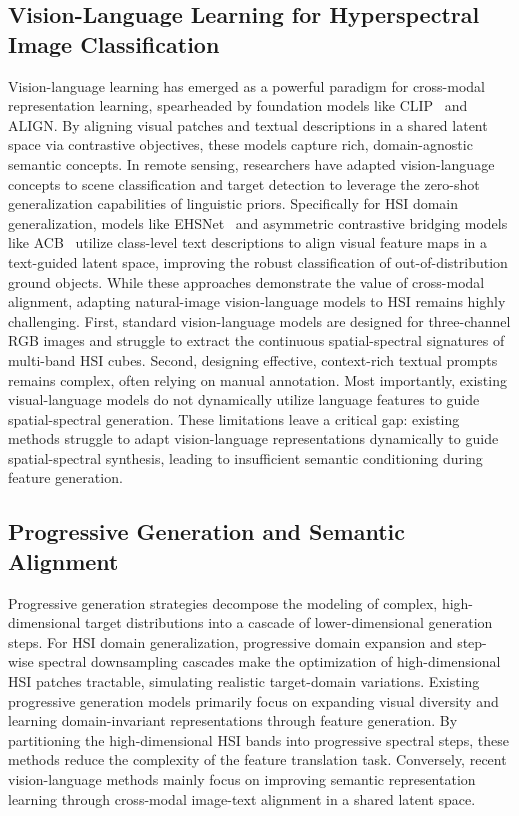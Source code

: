 \subsection{Vision-Language Learning for Hyperspectral Image Classification}
Vision-language learning has emerged as a powerful paradigm for cross-modal representation learning, spearheaded by foundation models like CLIP~\cite{radford2021learning} and ALIGN. By aligning visual patches and textual descriptions in a shared latent space via contrastive objectives, these models capture rich, domain-agnostic semantic concepts. In remote sensing, researchers have adapted vision-language concepts to scene classification and target detection to leverage the zero-shot generalization capabilities of linguistic priors. Specifically for HSI domain generalization, models like EHSNet~\cite{ehsnet2023} and asymmetric contrastive bridging models like ACB~\cite{acb2023} utilize class-level text descriptions to align visual feature maps in a text-guided latent space, improving the robust classification of out-of-distribution ground objects. While these approaches demonstrate the value of cross-modal alignment, adapting natural-image vision-language models to HSI remains highly challenging. First, standard vision-language models are designed for three-channel RGB images and struggle to extract the continuous spatial-spectral signatures of multi-band HSI cubes. Second, designing effective, context-rich textual prompts remains complex, often relying on manual annotation. Most importantly, existing visual-language models do not dynamically utilize language features to guide spatial-spectral generation. These limitations leave a critical gap: existing methods struggle to adapt vision-language representations dynamically to guide spatial-spectral synthesis, leading to insufficient semantic conditioning during feature generation.

\subsection{Progressive Generation and Semantic Alignment}
Progressive generation strategies decompose the modeling of complex, high-dimensional target distributions into a cascade of lower-dimensional generation steps. For HSI domain generalization, progressive domain expansion and step-wise spectral downsampling cascades make the optimization of high-dimensional HSI patches tractable, simulating realistic target-domain variations. Existing progressive generation models primarily focus on expanding visual diversity and learning domain-invariant representations through feature generation. By partitioning the high-dimensional HSI bands into progressive spectral steps, these methods reduce the complexity of the feature translation task. Conversely, recent vision-language methods mainly focus on improving semantic representation learning through cross-modal image-text alignment in a shared latent space.

